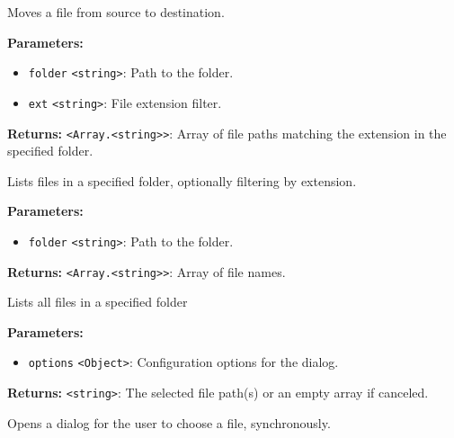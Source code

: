\documentclass[12pt,a4paper]{article}
\begin{document}
\noindent Moves a file from source to destination.

\vspace{5mm}
\noindent {}


\noindent \textbf{Parameters:}
\begin{itemize}
  \item \texttt{folder} \texttt{<string>}: Path to the folder.
  \item \texttt{ext} \texttt{<string>}: File extension filter.
\end{itemize}

\noindent \textbf{Returns:} \texttt{<Array.<string>>}: Array of file paths matching the extension in the specified folder.

\noindent Lists files in a specified folder, optionally filtering by extension.

\vspace{5mm}
\noindent {}


\noindent \textbf{Parameters:}
\begin{itemize}
  \item \texttt{folder} \texttt{<string>}: Path to the folder.
\end{itemize}

\noindent \textbf{Returns:} \texttt{<Array.<string>>}: Array of file names.

\noindent Lists all files in a specified folder

\vspace{5mm}
\noindent {}


\noindent \textbf{Parameters:}
\begin{itemize}
  \item \texttt{options} \texttt{<Object>}: Configuration options for the dialog.
\end{itemize}

\noindent \textbf{Returns:} \texttt{<string>}: The selected file path(s) or an empty array if canceled.

\noindent Opens a dialog for the user to choose a file, synchronously.
\end{document}
